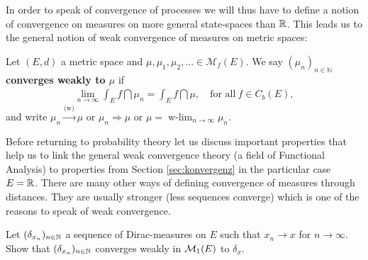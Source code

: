 In order to speak of convergence of processes we will thus have to define a notion of convergence on measures on more general state-spaces than $\mathbb{R}$. This leads us to the general notion of weak convergence of measures on metric spaces:
\begin{ldef}
\begin{deff}
	Let $(E,d)$ a metric space and $\mu,\mu_1,\mu_2,...\in \mathcal M_f(E)$. We say \textbf{$(\mu_n)_{n\in\mathbb{N}}$ converges weakly to $\mu$} if
	\begin{align*}
		\lim_{n\to\infty} \int_E f\dint \mu_n = \int_E f \dint \mu, \quad \text{for all}\: f \in C_b(E),
	\end{align*}
	and write $\mu_n \overset{\text{(w)}}{\longrightarrow}\mu$ or $\mu_n\Rightarrow \mu$ or $\mu = \operatorname{w-\lim\limits}_{n\to\infty}\mu_n$.
\end{deff}
\end{ldef}
Before returning to probability theory let us discuss important properties that help us to link the general weak convergence theory (a field of Functional Analysis) to properties from Section \ref{sec:konvergenz} in the particular case $E=\mathbb{R}$. 	There are many other ways of defining convergence of measures through distances. They are usually stronger (less sequences converge) which is one of the reasons to speak of weak convergence.
\begin{luebung}
	Let $(\delta_{x_n})_{n\in\mathbb{N}}$ a sequence of Dirac-measures on $E$ such that $x_n\to x$ for $n\to\infty$. Show that $(\delta_{x_n})_{n\in\mathbb{N}}$ converges weakly in $\mathcal{M}_1(E)$ to $\delta_x$.
\end{luebung}

